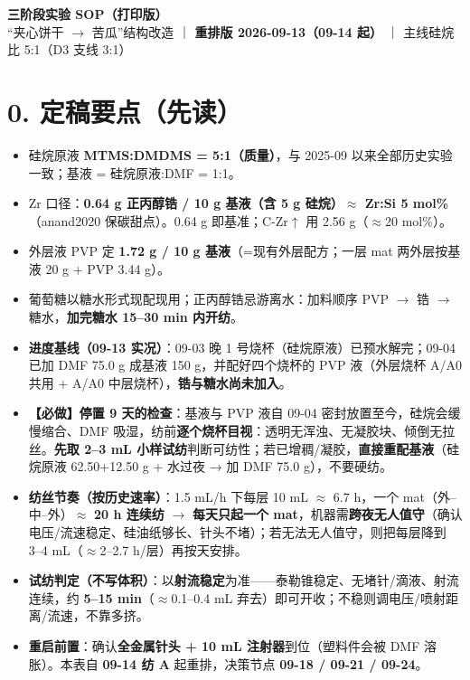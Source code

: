 \documentclass[a4paper, 10pt]{ctexart}
\begin{document}
\begin{center}
{\LARGE\bfseries 三阶段实验 SOP（打印版）}\\[3pt]
{\normalsize ``夹心饼干 $\rightarrow$ 苦瓜''结构改造 ｜ \textbf{重排版 2026-09-13（09-14 起）} ｜ 主线硅烷比 5:1（D3 支线 3:1）}
\end{center}

\section*{0. 定稿要点（先读）}
\begin{itemize}
  \item 硅烷原液 \textbf{MTMS:DMDMS = 5:1（质量）}，与 2025-09 以来全部历史实验一致；基液 = 硅烷原液:DMF = 1:1。
  \item Zr 口径：\textbf{0.64 g 正丙醇锆 / 10 g 基液（含 5 g 硅烷）$\approx$ Zr:Si 5 mol\%}（anand2020 保碳甜点）。0.64 g 即基准；C-Zr$\uparrow$ 用 2.56 g（$\approx$20 mol\%）。
  \item 外层液 PVP 定 \textbf{1.72 g / 10 g 基液}（=现有外层配方；一层 mat 两外层按基液 20 g + PVP 3.44 g）。
  \item 葡萄糖以糖水形式现配现用；正丙醇锆忌游离水：加料顺序 PVP $\rightarrow$ 锆 $\rightarrow$ 糖水，\textbf{加完糖水 15--30 min 内开纺}。
  \item \textbf{进度基线（09-13 实况）}：09-03 晚 1 号烧杯（硅烷原液）已预水解完；09-04 已加 DMF 75.0 g 成基液 150 g，并配好四个烧杯的 PVP 液（外层烧杯 A/A0 共用 + A/A0 中层烧杯），\textbf{锆与糖水尚未加入}。
  \item \textbf{【必做】停置 9 天的检查}：基液与 PVP 液自 09-04 密封放置至今，硅烷会缓慢缩合、DMF 吸湿，纺前\textbf{逐个烧杯目视}：透明无浑浊、无凝胶块、倾倒无拉丝。\textbf{先取 2--3 mL 小样试纺}判断可纺性；若已增稠/凝胶，\textbf{直接重配基液}（硅烷原液 62.50+12.50 g + 水过夜 → 加 DMF 75.0 g），不要硬纺。
  \item \textbf{纺丝节奏（按历史速率）}：1.5 mL/h 下每层 10 mL $\approx$ 6.7 h，一个 mat（外--中--外）$\approx$ \textbf{20 h 连续纺} $\rightarrow$ \textbf{每天只起一个 mat}，机器需\textbf{跨夜无人值守}（确认电压/流速稳定、硅油纸够长、针头不堵）；若无法无人值守，则把每层降到 3--4 mL（$\approx$2--2.7 h/层）再按天安排。
  \item \textbf{试纺判定（不写体积）}：以\textbf{射流稳定}为准——泰勒锥稳定、无堵针/滴液、射流连续，约 \textbf{5--15 min}（$\approx$0.1--0.4 mL 弃去）即可开收；不稳则调电压/喷射距离/流速，不靠多挤。
  \item \textbf{重启前置}：确认\textbf{全金属针头 + 10 mL 注射器}到位（塑料件会被 DMF 溶胀）。本表自 \textbf{09-14 纺 A} 起重排，决策节点 \textbf{09-18 / 09-21 / 09-24}。
\end{itemize}
\end{document}
